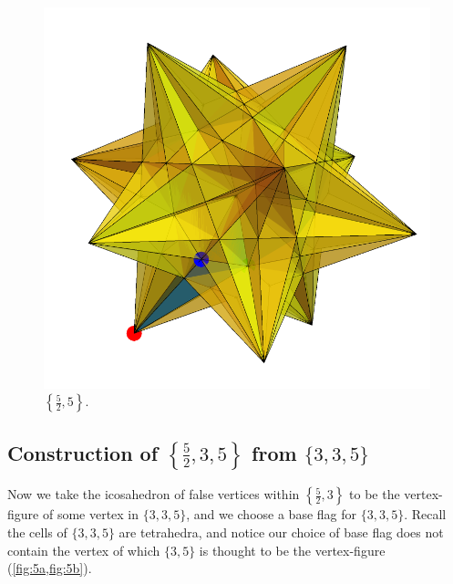 \documentclass{article}
\theoremstyle{definition}
\begin{document}
	\begin{figure}[H]
		\centering
		\includegraphics[width=.35\linewidth]{fig4}
		\caption{$\left\{\frac{5}{2},5\right\}$.}\label{fig:4}
	\end{figure}
	
	
	\subsection{Construction of $\left\{\frac{5}{2},3,5\right\}$ from $\{3,3,5\}$}
	
	Now we take the icosahedron of false vertices within $\left\{\frac{5}{2},3\right\}$ to be the vertex-figure of some vertex in $\{3,3,5\}$, and we choose a base flag for $\{3,3,5\}$. Recall the cells of $\{3,3,5\}$ are tetrahedra, and notice our choice of base flag does not contain the vertex of which $\{3,5\}$ is thought to be the vertex-figure (\cref{fig:5a,fig:5b}).
\end{document}
